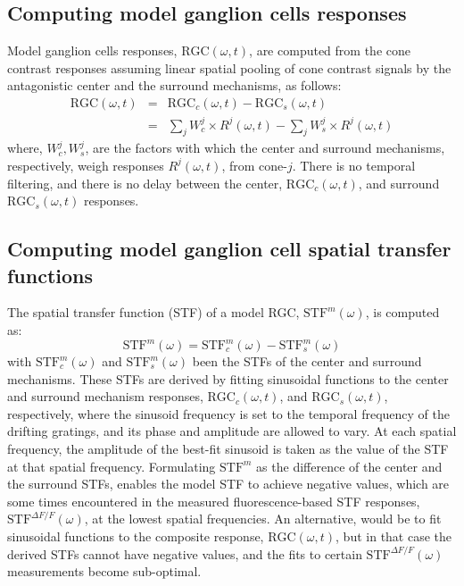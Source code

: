 \documentclass[11pt, oneside]{article}   	%
\begin{document}
\subsection{Computing model ganglion cells responses}
Model ganglion cells responses, $\mbox{RGC}(\omega,t)$, are computed from the cone contrast responses assuming linear spatial pooling of cone contrast signals by the antagonistic center and the surround mechanisms, as follows:
\begin{eqnarray}
\mbox{RGC}(\omega,t) & = & \mbox{RGC}_c(\omega,t) - \mbox{RGC}_s(\omega,t) \\
& = & \sum_{j} W_{c}^j  \times R^j(\omega, t) -  \sum_{j} W_{s}^j  \times R^j(\omega, t)
\end{eqnarray}
%
\noindent where, $W_{c}^j, W_{s}^j$, are the factors with which the center and surround mechanisms, respectively, weigh responses $R^j(\omega, t)$, from cone-$j$. There is no temporal filtering, and there is no delay between the center, $\mbox{RGC}_c(\omega,t)$, and surround $\mbox{RGC}_s(\omega,t)$ responses. 

\subsection{Computing model ganglion cell spatial transfer functions}
The spatial transfer function (STF) of a model RGC, $\mbox{STF}^{m}(\omega)$, is computed as: 
\begin{equation}
\mbox{STF}^{m}(\omega) = \mbox{STF}_{c}^{m}(\omega) - \mbox{STF}_{s}^{m}(\omega)
\end{equation}
%
\noindent with
%
$\mbox{STF}_{c}^{m}(\omega)$ and $\mbox{STF}_{s}^{m}(\omega)$ been the STFs of the center and surround mechanisms. These STFs are derived by fitting sinusoidal functions to the center and surround mechanism responses, $\mbox{RGC}_c(\omega,t)$, and $\mbox{RGC}_s(\omega,t)$, respectively, where the sinusoid frequency is set to the temporal frequency of the drifting gratings, and its phase and amplitude are allowed to vary. At each spatial frequency, the amplitude of the best-fit sinusoid is taken as the value of the STF at that spatial frequency. Formulating $\mbox{STF}^{m}$ as the difference of the center and the surround STFs, enables the model STF to achieve negative values, which are some times encountered in the measured fluorescence-based STF responses, $\mbox{STF}^{\Delta F / F}(\omega)$, at the lowest spatial frequencies. An alternative, would be to fit sinusoidal functions to the composite response, $\mbox{RGC}(\omega,t)$, but in that case the derived STFs cannot have negative values, and the fits to certain $\mbox{STF}^{\Delta F / F}(\omega)$ measurements become sub-optimal.
\end{document}
